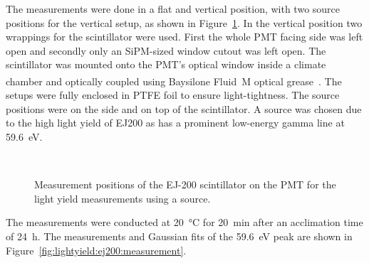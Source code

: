 The measurements were done in a flat and vertical position, with two source positions for the vertical setup, as shown in Figure~\ref{fig:lightyield:ej200:setup}.
In the vertical position two wrappings for the scintillator were used.
First the whole PMT facing side was left open and secondly only an \gls{SiPM}-sized window cutout was left open.
The scintillator was mounted onto the PMT's optical window inside a climate chamber and optically coupled using Baysilone\textsuperscript{{\textregistered}} Fluid~M optical grease~\cite{bayer:baysilone}.
The setups were fully enclosed in PTFE foil to ensure light-tightness.
The source positions were on the side and on top of the scintillator.
A  source was chosen due to the high light yield of EJ200 as  has a prominent low-energy gamma line at \SI{59.6}{\electronvolt}.

\begin{figure}[h]
    \centering        
    \hspace{0.02\textwidth}
    \\ 
    \caption{Measurement positions of the EJ-200 scintillator on the \gls{PMT} for the light yield measurements using a  source.}\label{fig:lightyield:ej200:setup}
\end{figure}

The measurements were conducted at \SI{20}{\celsius} for \SI{20}{\minute} after an acclimation time of \SI{24}{\hour}.
The measurements and Gaussian fits of the \SI{59.6}{\electronvolt} peak are shown in Figure~\ref{fig:lightyield:ej200:measurement}.

